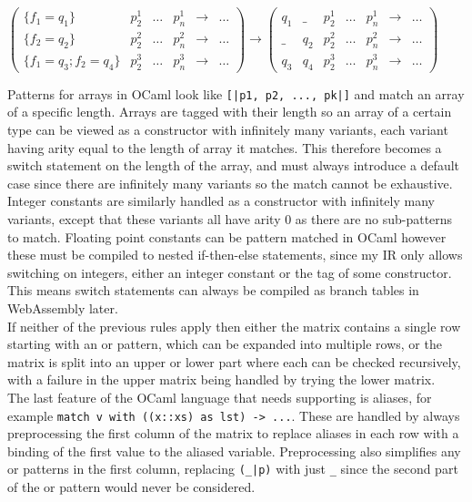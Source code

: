 $
\begin{pmatrix}
\{f_1=q_1\} & p^1_2 & \dots & p^1_n & \to & \dots \\
\{f_2=q_2\} & p^2_2 & \dots & p^2_n & \to &\dots \\
\{f_1=q_3; f_2=q_4\} & p^3_2 & \dots & p^3_n & \to &\dots
\end{pmatrix}
\to
\begin{pmatrix}
q_1 & \_ & p^1_2 & \dots & p^1_n  & \to & \dots \\
\_ & q_2 & p^2_2 & \dots & p^2_n  & \to & \dots \\
 q_3 & q_4 & p^3_2 & \dots & p^3_n  & \to & \dots
\end{pmatrix}
$

Patterns for arrays in OCaml look like \verb"[|p1, p2, ..., pk|]" and match an array of a specific length. Arrays are tagged with their length so an array of a certain type can be viewed as a constructor with infinitely many variants, each variant having arity equal to the length of array it matches. This therefore becomes a switch statement on the length of the array, and must always introduce a default case since there are infinitely many variants so the match cannot be exhaustive. Integer constants are similarly handled as a constructor with infinitely many variants, except that these variants all have arity 0 as there are no sub-patterns to match. Floating point constants can be pattern matched in OCaml however these must be compiled to nested if-then-else statements, since my IR only allows switching on integers, either an integer constant or the tag of some constructor. This means switch statements can always be compiled as branch tables in WebAssembly later. \\
If neither of the previous rules apply then either the matrix contains a single row starting with an or pattern, which can be expanded into multiple rows, or the matrix is split into an upper or lower part where each can be checked recursively, with a failure in the upper matrix being handled by trying the lower matrix.\\
The last feature of the OCaml language that needs supporting is aliases, for example \verb"match v with ((x::xs) as lst) -> ...". These are handled by always preprocessing the first column of the matrix to replace aliases in each row with a binding of the first value to the aliased variable. Preprocessing also simplifies any or patterns in the first column, replacing \verb"(_|p)" with just \verb|_| since the second part of the or pattern would never be considered.


